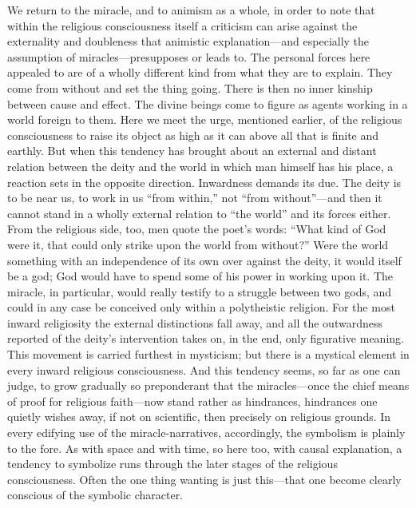 \documentclass[12pt,a4paper]{article}
\newcommand{\opage}[1]{\marginnote{\footnotesize\textit{[#1]}}}
\begin{document}
We return to the miracle, and to animism \opage{30}as a whole, in order to note that within
the religious consciousness itself a criticism can arise against the externality and
doubleness that animistic explanation---and especially the assumption of
miracles---presupposes or leads to. The personal forces here appealed to are of a
wholly different kind from what they are to explain. They come from without and set
the thing going. There is then no inner kinship between cause and effect. The divine
beings come to figure as agents working in a world foreign to them. Here we meet the
urge, mentioned earlier, of the religious consciousness to raise its object as high
as it can above all that is finite and earthly. But when this tendency has brought
about an external and distant relation between the deity and the world in which man
himself has his place, a reaction sets in the opposite direction. Inwardness demands
its due. The deity is to be near us, to work in us ``from within,'' not ``from
without''---and then it cannot stand in a wholly external relation to ``the world''
and its forces either. From the religious side, too, men quote the poet's words:
``What kind of God were it, that could only strike upon the world from without?''
Were the world something with an independence of its own over against the deity, it
would itself be a god; God would have to spend some of his power in working upon it.
The miracle, in particular, would really testify to a struggle between two gods, and
could in any case be conceived only within a polytheistic religion. For the most
inward religiosity the external distinctions fall away, and all the outwardness
reported of the deity's intervention takes on, in the end, only figurative meaning.
This movement is carried furthest in mysticism; but there is a mystical element in
every inward religious consciousness. And this tendency seems, so far as one can
judge, to grow gradually so preponderant that the miracles---once the chief means of
proof for religious faith---now \opage{31}stand rather as hindrances, hindrances one quietly
wishes away, if not on scientific, then precisely on religious grounds. In every
edifying use of the miracle-narratives, accordingly, the symbolism is plainly to the
fore. As with space and with time, so here too, with causal explanation, a tendency
to symbolize runs through the later stages of the religious consciousness. Often the
one thing wanting is just this---that one become clearly conscious of the symbolic
character.
\end{document}
